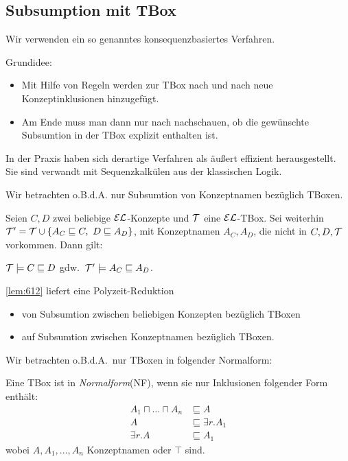 \subsection{Subsumption mit TBox}\label{subsumption-mit-tbox}
Wir verwenden ein so genanntes konsequenzbasiertes Verfahren.

Grundidee:
\begin{itemize}
    \item Mit Hilfe von Regeln werden zur TBox nach und nach neue Konzeptinklusionen hinzugefügt.
    \item Am Ende muss man dann nur nach nachschauen, ob die gewünschte Subsumtion in der TBox explizit enthalten ist.
\end{itemize}

In der Praxis haben sich derartige Verfahren als äußert effizient herausgestellt. Sie sind verwandt mit Sequenzkalkülen aus der klassischen Logik.

Wir betrachten o.B.d.A. nur Subsumtion von Konzeptnamen bezüglich TBoxen.

\begin{lemma}\label{lem:612}
    Seien $C, D$ zwei beliebige $\mathcal{E}\mathcal{L}$-Konzepte und $\mathcal{T}$ eine $\mathcal{E}\mathcal{L}$-TBox. Sei weiterhin
$\MT' = \MT \cup \left\{ A_C \sqsubseteq C,\ D \sqsubseteq A_D \right\}$,
mit Konzeptnamen $A_C,A_D$, die nicht in $C,D,\mathcal{T}$ vorkommen. Dann
gilt:
\begin{center}
$\mathcal{T} \models C \sqsubseteq D$ gdw.\
$\mathcal{T}' \models A_{C} \sqsubseteq A_{D}$.
\end{center}
\end{lemma}

\autoref{lem:612} liefert eine Polyzeit-Reduktion
\begin{itemize}
    \item von Subsumtion zwischen beliebigen Konzepten bezüglich TBoxen
    \item auf Subsumtion zwischen Konzeptnamen bezüglich TBoxen.
\end{itemize}

Wir betrachten o.B.d.A.\ nur TBoxen in folgender Normalform:

\begin{definition}[Normalform]
    Eine TBox ist in \emph{Normalform}(NF), wenn sie nur Inklusionen folgender
Form enthält: \begin{align*}
    A_1 \sqcap \ldots \sqcap A_n &\sqsubseteq A\\
A &\sqsubseteq \exists r.A_1\\
\exists r.A &\sqsubseteq A_1
\end{align*}
wobei $A, A_1, \ldots, A_n$ Konzeptnamen oder $\top$ sind.
\end{definition}

